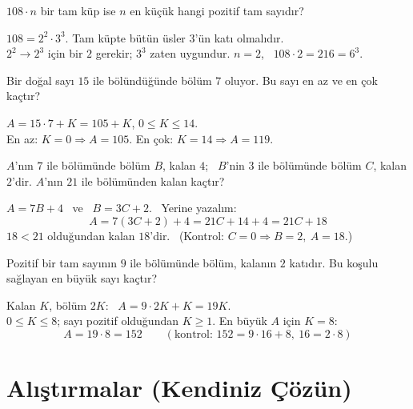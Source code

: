 \begin{alistirma}
\(108\cdot n\) bir tam küp ise \(n\) en küçük hangi pozitif tam sayıdır?
\end{alistirma}
\begin{cozum}
\(108=2^2\cdot 3^3\). Tam küpte bütün üsler \(3\)'ün katı olmalıdır.\\
\(2^2\to 2^3\) için bir \(2\) gerekir; \(3^3\) zaten uygundur. \quad \(n=2\), \ \(108\cdot 2=216=6^3\).
\end{cozum}

\begin{alistirma}
Bir doğal sayı \(15\) ile bölündüğünde bölüm \(7\) oluyor. Bu sayı en az ve en çok kaçtır?
\end{alistirma}
\begin{cozum}
\(A=15\cdot 7+K=105+K\), \quad \(0\le K\le 14\).\\
En az: \(K=0\Rightarrow A=105\). \quad En çok: \(K=14\Rightarrow A=119\).
\end{cozum}

\begin{alistirma}
\(A\)'nın \(7\) ile bölümünde bölüm \(B\), kalan \(4\); \ \(B\)'nin \(3\) ile bölümünde bölüm \(C\), kalan \(2\)'dir. \(A\)'nın \(21\) ile bölümünden kalan kaçtır?
\end{alistirma}
\begin{cozum}
\(A=7B+4\) \ ve \ \(B=3C+2\). \ Yerine yazalım:
\[A=7(3C+2)+4=21C+14+4=21C+18\]
\(18<21\) olduğundan kalan \(18\)'dir. \ (Kontrol: \(C=0\Rightarrow B=2,\ A=18\).)
\end{cozum}

\begin{alistirma}
Pozitif bir tam sayının \(9\) ile bölümünde bölüm, kalanın \(2\) katıdır. Bu koşulu sağlayan en büyük sayı kaçtır?
\end{alistirma}
\begin{cozum}
Kalan \(K\), bölüm \(2K\): \ \(A=9\cdot 2K+K=19K\).\\
\(0\le K\le 8\); sayı pozitif olduğundan \(K\ge 1\). En büyük \(A\) için \(K=8\):
\[A=19\cdot 8=152\qquad(\text{kontrol: } 152=9\cdot 16+8,\ 16=2\cdot 8)\]
\end{cozum}

\kendinizoncesi
\section{Alıştırmalar (Kendiniz Çözün)}

